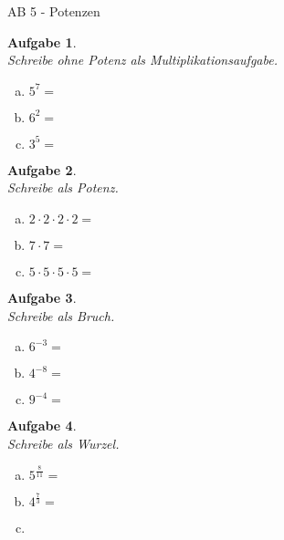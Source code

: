 \documentclass[12pt,fleqn]{article}
\theoremstyle{aufg}
\newtheorem{aufgabe}{Aufgabe}
\theoremstyle{bsp}
\begin{document}
 
    \begin{flushleft}
\begin{center}AB 5 - Potenzen\end{center}\begin{aufgabe} ~ \\ 
Schreibe ohne Potenz als Multiplikationsaufgabe. \\ 
\begin{multicols}{3} 
\begin{enumerate}[a)] 
\item 
$5^{7}=$
\item 
$6^{2}=$
\item 
$3^{5}=$
\end{enumerate} 
\end{multicols} 
\end{aufgabe} 
\begin{aufgabe} ~ \\ 
Schreibe als Potenz. \\ 
\begin{multicols}{3} 
\begin{enumerate}[a)] 
\item 
$2\cdot2\cdot2\cdot2=$
\item 
$7\cdot7=$
\item 
$5\cdot5\cdot5\cdot5=$
\end{enumerate} 
\end{multicols} 
\end{aufgabe} 
\begin{aufgabe} ~ \\ 
Schreibe als Bruch. \\ 
\begin{multicols}{3} 
\begin{enumerate}[a)] 
\item 
$6^{-3}=$
\item 
$4^{-8}=$
\item 
$9^{-4}=$
\end{enumerate} 
\end{multicols} 
\end{aufgabe} 
\begin{aufgabe} ~ \\ 
Schreibe als Wurzel. \\ 
\begin{multicols}{3} 
\begin{enumerate}[a)] 
\item 
$5^{\frac{8}{11}}=$
\item 
$4^{\frac{7}{3}}=$
\item 

\end{enumerate}
\end{multicols}
\end{aufgabe}
\end{flushleft}
\end{document}
